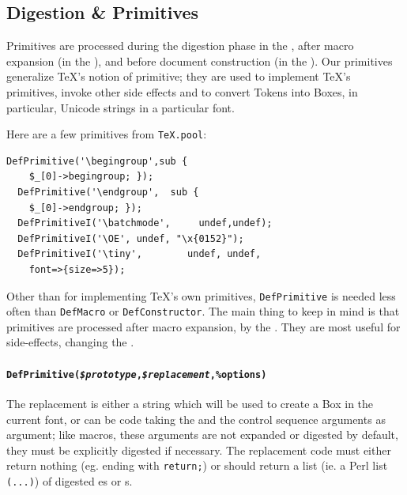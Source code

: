 \documentclass{book}
\newcommand{\ltxcode}{\lstinline[style=inlinelatexml]}
\begin{document}

\subsection[Digestion]{Digestion \& Primitives}\label{customization.latexml.digestion}
Primitives are processed during the digestion phase in the ,
after macro expansion (in the ),
and before document construction (in the ).
Our primitives generalize \TeX's notion of primitive; they are used to implement
\TeX's primitives, invoke other side effects and to convert Tokens into Boxes,
in particular, Unicode strings in a particular font.

Here are a few primitives from \texttt{TeX.pool}:
\begin{lstlisting}[style=latexml]
  DefPrimitive('\begingroup',sub {
    $_[0]->begingroup; });
  DefPrimitive('\endgroup',  sub {
    $_[0]->endgroup; });
  DefPrimitiveI('\batchmode',     undef,undef);
  DefPrimitiveI('\OE', undef, "\x{0152}");
  DefPrimitiveI('\tiny',        undef, undef,
    font=>{size=>5});
\end{lstlisting}

Other than for implementing \TeX's own primitives,
\texttt{DefPrimitive} is needed less often than \texttt{DefMacro} or \texttt{DefConstructor}.
 The main thing to keep in mind
is that primitives are processed after macro expansion,
by the .  They are most useful for
side-effects, changing the .

\paragraph[DefPrimitive]{%
  {\texttt{DefPrimitive(\textit{\$prototype},\textit{\$replacement},\texttt{\%options})}}}
The replacement is either a string which will be used to create
a Box in the current font, or can be code taking the 
and the control sequence arguments as argument; like macros, these arguments
are not expanded or digested by default, they must be explicitly digested if necessary.
The replacement code must either return nothing (eg. ending with \ltxcode|return;|) or
should return a list (ie. a Perl list \ltxcode|(...)|)
of digested es or s.
\end{document}
